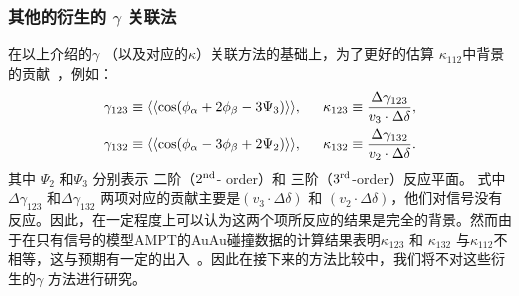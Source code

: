 \subsubsection{其他的衍生的 $\gamma$ 关联法}
在以上介绍的$\gamma$ （以及对应的$\kappa$）关联方法的基础上，为了更好的估算 $\kappa_{112}$中背景的贡献~\cite{CMS2}，例如：
\begin{eqnarray}
\gamma_{123} \equiv \langle \langle \cos(\phi_\alpha + 2\phi_\beta -3{\rm \Psi_{3}}) \rangle\rangle&,~\ & \kappa_{123} \equiv \frac{\Delta \gamma_{123}}{v_3 \cdot \Delta \delta}, 
\\
\gamma_{132} \equiv \langle \langle \cos(\phi_\alpha - 3\phi_\beta + 2{\rm \Psi_{2}}) \rangle\rangle&,~\ &
\kappa_{132} \equiv \frac{\Delta \gamma_{132}}{v_2 \cdot \Delta \delta}.
\end{eqnarray}
其中 $\Psi_{2}$ 和$\Psi_{3}$ 分别表示 二阶（$2^{\rm nd}$- order）和 三阶（$3^{\rm rd}$-order）反应平面。
式中$\Delta\gamma_{123}$ 和$\Delta\gamma_{132}$ 两项对应的贡献主要是$(v_3 \cdot \Delta\delta)$ 和 $(v_2 \cdot \Delta\delta)$，他们对信号没有反应。因此，在一定程度上可以认为这两个项所反应的结果是完全的背景。然而由于在只有信号的模型AMPT的AuAu碰撞数据的计算结果表明$\kappa_{123}$ 和 $\kappa_{132}$ 与$\kappa_{112}$不相等，这与预期有一定的出入~\cite{Subikash}。因此在接下来的方法比较中，我们将不对这些衍生的$\gamma$ 方法进行研究。


